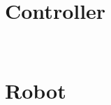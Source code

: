 \newpage

\section{Controller}
\begin{lstlisting}[style=vhdlStyle]
 
\end{lstlisting}

\newpage

\section{Robot}
\begin{lstlisting}[style=vhdlStyle]


 \end{lstlisting}
